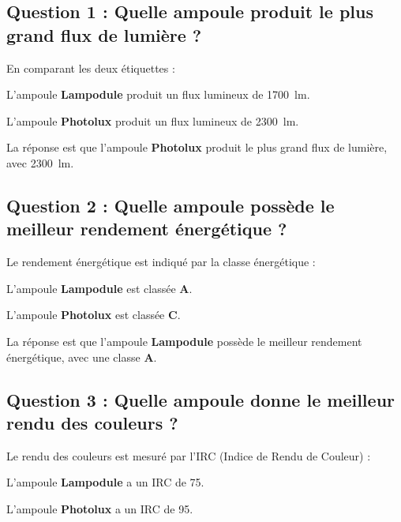 \documentclass[answers]{exam}
\begin{document}
    \begin{solution}
\begin{questions}

\subsection*{Question 1 : Quelle ampoule produit le plus grand flux de lumière ?}

En comparant les deux étiquettes :
\begin{compactitem}
    \item L'ampoule \textbf{Lampodule} produit un flux lumineux de \SI{1700}{lm}.
    \item L'ampoule \textbf{Photolux} produit un flux lumineux de \SI{2300}{lm}.
\end{compactitem}

La réponse est que l'ampoule \textbf{Photolux} produit le plus grand flux de lumière, avec \SI{2300}{lm}.

\subsection*{Question 2 : Quelle ampoule possède le meilleur rendement énergétique ?}

Le rendement énergétique est indiqué par la classe énergétique :
\begin{compactitem}
    \item L'ampoule \textbf{Lampodule} est classée \textbf{A}.
    \item L'ampoule \textbf{Photolux} est classée \textbf{C}.
\end{compactitem}

La réponse est que l'ampoule \textbf{Lampodule} possède le meilleur rendement énergétique, avec une classe \textbf{A}.

\subsection*{Question 3 : Quelle ampoule donne le meilleur rendu des couleurs ?}

Le rendu des couleurs est mesuré par l'IRC (Indice de Rendu de Couleur) :
\begin{compactitem}
    \item L'ampoule \textbf{Lampodule} a un IRC de \num{75}.
    \item L'ampoule \textbf{Photolux} a un IRC de \num{95}.
\end{compactitem}


\end{questions}
\end{solution}
\end{document}
